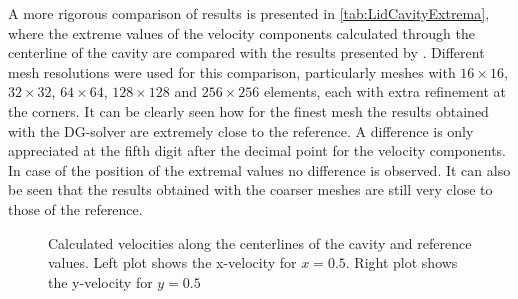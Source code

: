 A more rigorous comparison of results is presented in \cref{tab:LidCavityExtrema}, where the extreme values of the velocity components calculated through the centerline of the cavity are compared with the results presented by \textcite{botellaBenchmarkSpectralResults1998}. Different mesh resolutions were used for this comparison, particularly meshes with $16\times16$, $32\times32$, $64\times64$, $128\times128$ and $256\times256$ elements, each with extra refinement at the corners. It can be clearly seen how for the finest mesh the results obtained with the DG-solver are extremely close to the reference. A difference is only appreciated at the fifth digit after the decimal point for the velocity components. In case of the position of the extremal values no difference is observed. It can also be seen that the results obtained with the coarser meshes are still very close to those of the reference.

\begin{figure}[tb]
	\caption{Calculated velocities along the centerlines of the cavity and reference values. Left plot shows the x-velocity for $x = 0.5$. Right plot shows the y-velocity for $y = 0.5$  }
	\label{fig:LidVelocities}
\end{figure}


